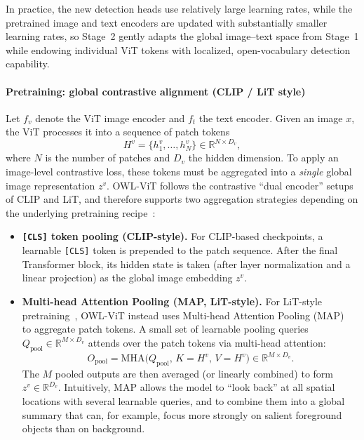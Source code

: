 \begin{enrichment}
\begin{enrichment}[Method][subsection]
\begin{enumerate}
			In practice, the new detection heads use relatively large learning rates, while the pretrained image and text encoders are updated with substantially smaller learning rates, so Stage~2 gently adapts the global image--text space from Stage~1 while endowing individual ViT tokens with localized, open-vocabulary detection capability.
		\end{enumerate}
		
		\paragraph{Pretraining: global contrastive alignment (CLIP / LiT style)}
		Let $f_v$ denote the ViT image encoder and $f_t$ the text encoder.
		Given an image $x$, the ViT processes it into a sequence of patch tokens
		\[
		H^v = \{h^v_1,\dots,h^v_N\} \in \mathbb{R}^{N \times D_v},
		\]
		where $N$ is the number of patches and $D_v$ the hidden dimension.
		To apply an image-level contrastive loss, these tokens must be aggregated into a \emph{single} global image representation $z^v$.
		OWL-ViT follows the contrastive ``dual encoder'' setups of CLIP and LiT, and therefore supports two aggregation strategies depending on the underlying pretraining recipe~\cite{radford2021_clip,zhai2022_lit}:
		
		\begin{itemize}
			\item \textbf{\texttt{[CLS]} token pooling (CLIP-style).}
			For CLIP-based checkpoints, a learnable \texttt{[CLS]} token is prepended to the patch sequence.
			After the final Transformer block, its hidden state is taken (after layer normalization and a linear projection) as the global image embedding $z^v$.
			
			\item \textbf{Multi-head Attention Pooling (MAP, LiT-style).}
			For LiT-style pretraining~\cite{zhai2022_lit}, OWL-ViT instead uses Multi-head Attention Pooling (MAP)~\cite{zhai2022_lit} to aggregate patch tokens.
			A small set of learnable pooling queries $Q_{\text{pool}} \in \mathbb{R}^{M \times D_v}$ attends over the patch tokens via multi-head attention:
			\[
			O_{\text{pool}} = \mathrm{MHA}\bigl(Q_{\text{pool}},\, K = H^v,\, V = H^v\bigr) \in \mathbb{R}^{M \times D_v}.
			\]
			The $M$ pooled outputs are then averaged (or linearly combined) to form $z^v \in \mathbb{R}^{D_v}$.
			Intuitively, MAP allows the model to ``look back'' at all spatial locations with several learnable queries, and to combine them into a global summary that can, for example, focus more strongly on salient foreground objects than on background.
		\end{itemize}
		

\end{enrichment}
\end{enrichment}
